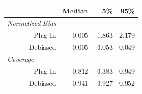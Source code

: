 \begin{tabular}[t]{r|rrr}
\toprule 
& Median & 5\% & 95\% \\
\midrule
\multicolumn{1}{l|}{\textit{Normalized Bias}} \\
Plug-In & -0.005 & -1.863 & 2.179 \\ 
Debiased & -0.005 & -0.053 & 0.049 \\
\midrule 
\multicolumn{1}{l|}{\textit{Coverage}} \\
Plug-In & 0.812 & 0.383 & 0.949 \\
Debiased & 0.941 & 0.927 & 0.952 \\
\bottomrule
\end{tabular}